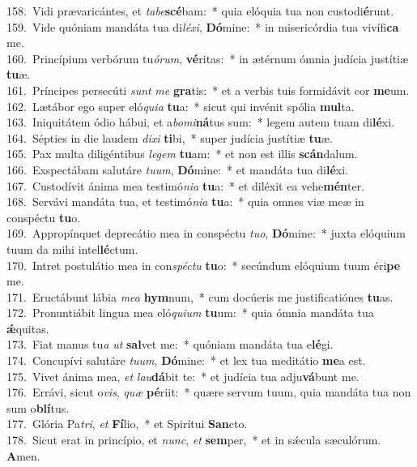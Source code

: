 {158.~}Vidi prævaricántes, et \textit{ta}\textit{be}\textbf{scé}bam:~* quia elóquia tua non custodi\textbf{é}runt.\\
{159.~}Vide quóniam mandáta tua di\textit{lé}\textit{xi}, \textbf{Dó}mine:~* in misericórdia tua vivífi\textbf{ca} me.\\
{160.~}Princípium verbórum tu\textit{ó}\textit{rum}, \textbf{vé}ritas:~* in ætérnum ómnia judícia justítiæ \textbf{tu}æ.\\
{161.~}Príncipes persecúti \textit{sunt} \textit{me} \textbf{gra}tis:~* et a verbis tuis formidávit cor \textbf{me}um.\\
{162.~}Lætábor ego super eló\textit{qui}\textit{a} \textbf{tu}a:~* sicut qui invénit spólia \textbf{mul}ta.\\
{163.~}Iniquitátem ódio hábui, et a\textit{bo}\textit{mi}\textbf{ná}tus sum:~* legem autem tuam di\textbf{lé}xi.\\
{164.~}Sépties in die laudem \textit{di}\textit{xi} \textbf{ti}bi,~* super judícia justítiæ \textbf{tu}æ.\\
{165.~}Pax multa diligéntibus \textit{le}\textit{gem} \textbf{tu}am:~* et non est illis \textbf{scán}dalum.\\
{166.~}Exspectábam salutáre \textit{tu}\textit{um}, \textbf{Dó}mine:~* et mandáta tua di\textbf{lé}xi.\\
{167.~}Custodívit ánima mea testimó\textit{ni}\textit{a} \textbf{tu}a:~* et diléxit ea vehe\textbf{mén}ter.\\
{168.~}Servávi mandáta tua, et testimó\textit{ni}\textit{a} \textbf{tu}a:~* quia omnes viæ meæ in conspéctu \textbf{tu}o.\\
{169.~}Appropínquet deprecátio mea in conspéctu \textit{tu}\textit{o}, \textbf{Dó}mine:~* juxta elóquium tuum da mihi intel\textbf{lé}ctum.\\
{170.~}Intret postulátio mea in con\textit{spé}\textit{ctu} \textbf{tu}o:~* secúndum elóquium tuum éri\textbf{pe} me.\\
{171.~}Eructábunt lábia \textit{me}\textit{a} \textbf{hym}num,~* cum docúeris me justificatiónes \textbf{tu}as.\\
{172.~}Pronuntiábit lingua mea eló\textit{qui}\textit{um} \textbf{tu}um:~* quia ómnia mandáta tua \textbf{ǽ}quitas.\\
{173.~}Fiat manus tu\textit{a} \textit{ut} \textbf{sal}vet me:~* quóniam mandáta tua e\textbf{lé}gi.\\
{174.~}Concupívi salutáre \textit{tu}\textit{um}, \textbf{Dó}mine:~* et lex tua meditátio \textbf{me}a est.\\
{175.~}Vivet ánima mea, \textit{et} \textit{lau}\textbf{dá}bit te:~* et judícia tua adju\textbf{vá}bunt me.\\
{176.~}Errávi, sicut o\textit{vis}, \textit{quæ} \textbf{pé}riit:~* quære servum tuum, quia mandáta tua non sum o\textbf{blí}tus.\\
{177.~}Glória Pa\textit{tri}, \textit{et} \textbf{Fí}lio,~* et Spirítui \textbf{San}cto.\\
{178.~}Sicut erat in princípio, et \textit{nunc}, \textit{et} \textbf{sem}per,~* et in sǽcula sæculórum. \textbf{A}men.\\
